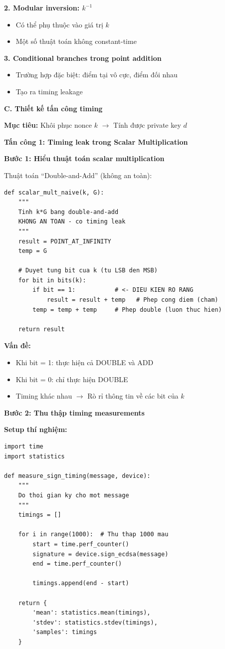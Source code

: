 \textbf{2. Modular inversion: $k^{-1}$}
\begin{itemize}
    \item Có thể phụ thuộc vào giá trị $k$
    \item Một số thuật toán không constant-time
\end{itemize}

\textbf{3. Conditional branches trong point addition}
\begin{itemize}
    \item Trường hợp đặc biệt: điểm tại vô cực, điểm đối nhau
    \item Tạo ra timing leakage
\end{itemize}


\textbf{C. Thiết kế tấn công timing}

\textbf{Mục tiêu:} Khôi phục nonce $k$ $\rightarrow$ Tính được private key $d$

\textbf{Tấn công 1: Timing leak trong Scalar Multiplication}

\textbf{Bước 1: Hiểu thuật toán scalar multiplication}

Thuật toán ``Double-and-Add'' (không an toàn):

\begin{verbatim}
def scalar_mult_naive(k, G):
    """
    Tinh k*G bang double-and-add
    KHONG AN TOAN - co timing leak
    """
    result = POINT_AT_INFINITY
    temp = G
    
    # Duyet tung bit cua k (tu LSB den MSB)
    for bit in bits(k):
        if bit == 1:           # <- DIEU KIEN RO RANG
            result = result + temp   # Phep cong diem (cham)
        temp = temp + temp     # Phep double (luon thuc hien)
    
    return result
\end{verbatim}

\textbf{Vấn đề:}
\begin{itemize}
    \item Khi bit = 1: thực hiện cả DOUBLE và ADD
    \item Khi bit = 0: chỉ thực hiện DOUBLE
    \item Timing khác nhau $\rightarrow$ Rò rỉ thông tin về các bit của $k$
\end{itemize}
\textbf{Bước 2: Thu thập timing measurements}

\textbf{Setup thí nghiệm:}

\begin{verbatim}
import time
import statistics

def measure_sign_timing(message, device):
    """
    Do thoi gian ky cho mot message
    """
    timings = []
    
    for i in range(1000):  # Thu thap 1000 mau
        start = time.perf_counter()
        signature = device.sign_ecdsa(message)
        end = time.perf_counter()
        
        timings.append(end - start)
    
    return {
        'mean': statistics.mean(timings),
        'stdev': statistics.stdev(timings),
        'samples': timings
    }
\end{verbatim}

